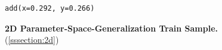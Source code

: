 \begin{figure}
\centering
{}
\begin{verbatim}
add(x=0.292, y=0.266)
\end{verbatim}
\caption{\textbf{2D Parameter-Space-Generalization Train Sample.} (\cref{sssection:2d})}
\label{fig:code_2d}
\end{figure}
